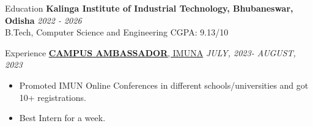 \documentclass{resume} %
\begin{document}
\begin{rSection}{Education}
{\bf Kalinga Institute of Industrial Technology, Bhubaneswar, Odisha} \hfill {\em 2022 - 2026} 
\\ B.Tech, Computer Science and Engineering \hfill {CGPA: 9.13/10}

\end{rSection}
\begin{rSection}{Experience}
\href{https://1drv.ms/i/s!AqmF3ryI8xyngdlvi5puoHlWRF5NTQ?e=hyfCRH}{{\bf CAMPUS AMBASSADOR}{, IMUNA}} \hfill {\em JULY, 2023- AUGUST, 2023}
\begin{itemize}
    \item Promoted IMUN Online Conferences in different schools/universities and got 10+ registrations.
    \item Best Intern for a week.
\end{itemize}
\end{rSection}
\end{document}
